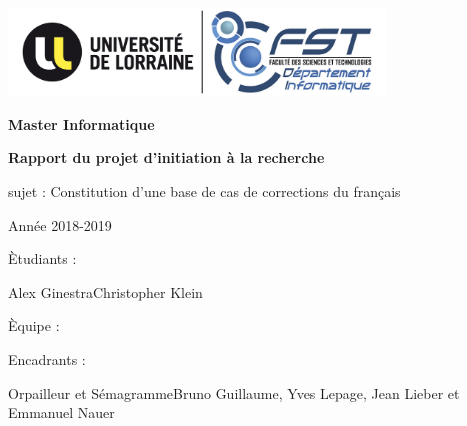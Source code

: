 \documentclass{article}
\begin{document}
\begin{center}
\includegraphics[width=10cm]{logoULFST.jpg} %
\end{center}

\begin{center}
\thispagestyle{empty}
{\bfseries \large Master Informatique}
\end{center}

\vspace*{70mm}
\begin{center}
	{\bfseries \Huge Rapport du projet d'initiation \`{a} la recherche}
\end{center}
\vspace*{10mm}
\begin{center}
{\large sujet : Constitution d'une base de cas de corrections du fran\c{c}ais}
\end{center}
\begin{center}
{\large Ann\'ee 2018-2019}
\end{center}



\vspace*{60mm}
\begin{multicols}{2}
\begin{multicols}{2}
	\begin{flushright}
		\`{E}tudiants :
	\end{flushright}
		\vfill\null\columnbreak
	\begin{flushleft}
		Alex Ginestra\newline Christopher Klein
	\end{flushleft}
\end{multicols}
\vfill\null\columnbreak
\begin{multicols}{2}
	\begin{flushright}
		\`{E}quipe :
	\end{flushright}
	\begin{flushright}
		Encadrants :
	\end{flushright}
	\vfill\null\columnbreak
	\begin{flushleft}
	Orpailleur et S\'emagramme\newline Bruno Guillaume, Yves Lepage, Jean Lieber et Emmanuel Nauer
	\end{flushleft}
\end{multicols}
\end{multicols}
\cleardoublepage
\cleardoublepage
\end{document}
